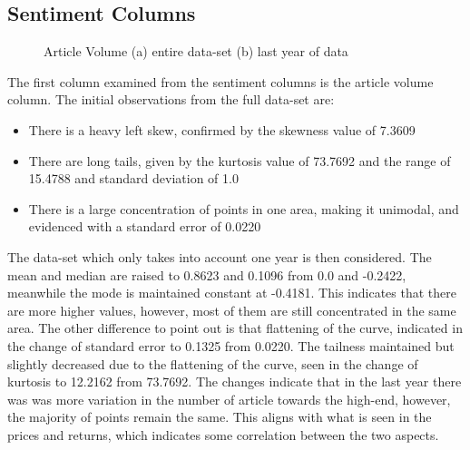 \subsection{Sentiment Columns}

\begin{figure}[h!]
    \centering
    \caption{Article Volume (a) entire data-set (b) last year of data}
    \label{fig:articleDesc}
\end{figure}

The first column examined from the sentiment columns is the article volume column. The initial observations from the full data-set are:
\begin{itemize}
    \item There is a heavy left skew, confirmed by the skewness value of 7.3609
    \item There are long tails, given by the kurtosis value of 73.7692 and the range of 15.4788 and standard deviation of 1.0
    \item There is a large concentration of points in one area, making it unimodal, and evidenced with a standard error of 0.0220
\end{itemize}
The data-set which only takes into account one year is then considered. The mean and median are raised to 0.8623 and 0.1096 from 0.0 and -0.2422, meanwhile the mode is maintained constant at -0.4181. This indicates that there are more higher values, however, most of them are still concentrated in the same area. The other difference to point out is that flattening of the curve, indicated in the change of standard error to 0.1325 from 0.0220. The tailness maintained but slightly decreased due to the flattening of the curve, seen in the change of kurtosis to 12.2162 from 73.7692. The changes indicate that in the last year there was was more variation in the number of article towards the high-end, however, the majority of points remain the same. This aligns with what is seen in the prices and returns, which indicates some correlation between the two aspects.

